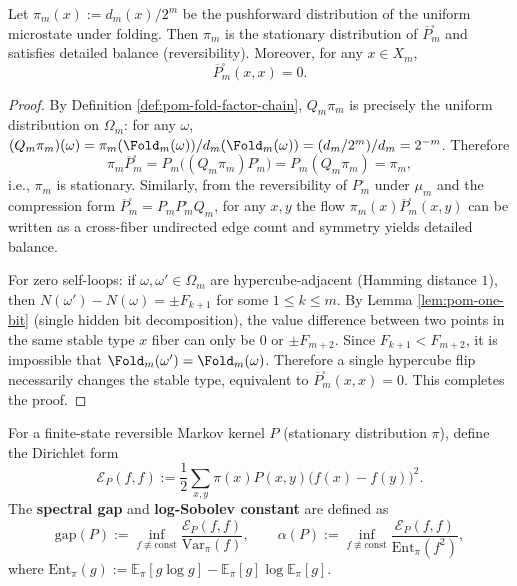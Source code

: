 \begin{proposition}\label{prop:pom-fold-factor-chain-reversible-noloop}
Let
\(
\pi_m(x):=d_m(x)/2^m
\)
be the pushforward distribution of the uniform microstate under folding.
Then \(\pi_m\) is the stationary distribution of \(\overline P^{\square}_m\) and satisfies detailed balance (reversibility).
Moreover, for any \(x\in X_m\),
\[
\overline P^{\square}_m(x,x)=0.
\]
\end{proposition}
\begin{proof}
By Definition \ref{def:pom-fold-factor-chain},
\(
Q_m\pi_m
\)
is precisely the uniform distribution on \(\Omega_m\): for any \(\omega\),
\(
(Q_m\pi_m)(\omega)=\pi_m(\Fold_m(\omega))/d_m(\Fold_m(\omega))=(d_m/2^m)/d_m=2^{-m}
\).
Therefore
\[
\pi_m\overline P^{\square}_m
=
P_m\bigl((Q_m\pi_m)P^{\square}_m\bigr)
=
P_m(Q_m\pi_m)
=\pi_m,
\]
i.e., \(\pi_m\) is stationary.
Similarly, from the reversibility of \(P^{\square}_m\) under \(\mu_m\) and the compression form \(\overline P^{\square}_m=P_mP^{\square}_mQ_m\),
for any \(x,y\) the flow \(\pi_m(x)\overline P^{\square}_m(x,y)\) can be written as a cross-fiber undirected edge count and symmetry yields detailed balance.
\par
For zero self-loops: if \(\omega,\omega'\in\Omega_m\) are hypercube-adjacent (Hamming distance \(1\)), then
\(
N(\omega')-N(\omega)=\pm F_{k+1}
\)
for some \(1\le k\le m\).
By Lemma \ref{lem:pom-one-bit} (single hidden bit decomposition), the value difference between two points in the same stable type \(x\) fiber can only be \(0\) or \(\pm F_{m+2}\).
Since \(F_{k+1}<F_{m+2}\), it is impossible that \(\Fold_m(\omega')=\Fold_m(\omega)\).
Therefore a single hypercube flip necessarily changes the stable type, equivalent to \(\overline P^{\square}_m(x,x)=0\). This completes the proof.
\end{proof}
\begin{definition}\label{def:pom-gap-lsi}
For a finite-state reversible Markov kernel \(P\) (stationary distribution \(\pi\)), define the Dirichlet form
\[
\mathcal E_P(f,f):=\frac12\sum_{x,y}\pi(x)P(x,y)\bigl(f(x)-f(y)\bigr)^2.
\]
The \textbf{spectral gap} and \textbf{log-Sobolev constant} are defined as
\[
\mathrm{gap}(P):=\inf_{f\not\equiv \mathrm{const}}\frac{\mathcal E_P(f,f)}{\mathrm{Var}_{\pi}(f)},
\qquad
\alpha(P):=\inf_{f\not\equiv \mathrm{const}}\frac{\mathcal E_P(f,f)}{\mathrm{Ent}_{\pi}(f^2)},
\]
where
\(
\mathrm{Ent}_{\pi}(g):=\mathbb E_{\pi}[g\log g]-\mathbb E_{\pi}[g]\log\mathbb E_{\pi}[g]
\).
\end{definition}
